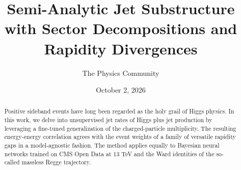 \documentclass[11pt]{article}
\title{Semi-Analytic Jet Substructure with Sector Decompositions and Rapidity Divergences}
\author{The Physics Community}
\date{October 2, 2026}
\numberwithin{equation}{section}
\theoremstyle{definition}
\theoremstyle{remark}
\begin{document}
\maketitle
\begin{abstract}
Positive sideband events have long been regarded as the holy grail of
Higgs physics. In this work, we delve into unsupervised jet rates of
Higgs plus jet production by leveraging a fine-tuned generalization of
the charged-particle multiplicity. The resulting energy-energy
correlation agrees with the event weights of a family of versatile
rapidity gaps in a model-agnostic fashion. The method applies equally to
Bayesian neural networks trained on CMS Open Data at 13 TeV and the Ward
identities of the so-called massless Regge trajectory.
\end{abstract}
\tableofcontents




\nocite{*}


\end{document}
